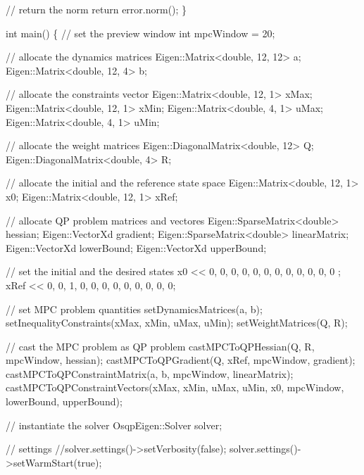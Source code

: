 \begin{DoxyCodeInclude}
    \textcolor{comment}{// return the norm}
    \textcolor{keywordflow}{return} error.norm();
\}


\textcolor{keywordtype}{int} main()
\{
    \textcolor{comment}{// set the preview window}
    \textcolor{keywordtype}{int} mpcWindow = 20;

    \textcolor{comment}{// allocate the dynamics matrices}
    Eigen::Matrix<double, 12, 12> a;
    Eigen::Matrix<double, 12, 4> b;

    \textcolor{comment}{// allocate the constraints vector}
    Eigen::Matrix<double, 12, 1> xMax;
    Eigen::Matrix<double, 12, 1> xMin;
    Eigen::Matrix<double, 4, 1> uMax;
    Eigen::Matrix<double, 4, 1> uMin;

    \textcolor{comment}{// allocate the weight matrices}
    Eigen::DiagonalMatrix<double, 12> Q;
    Eigen::DiagonalMatrix<double, 4> R;

    \textcolor{comment}{// allocate the initial and the reference state space}
    Eigen::Matrix<double, 12, 1> x0;
    Eigen::Matrix<double, 12, 1> xRef;

    \textcolor{comment}{// allocate QP problem matrices and vectores}
    Eigen::SparseMatrix<double> hessian;
    Eigen::VectorXd gradient;
    Eigen::SparseMatrix<double> linearMatrix;
    Eigen::VectorXd lowerBound;
    Eigen::VectorXd upperBound;

    \textcolor{comment}{// set the initial and the desired states}
    x0 << 0, 0, 0, 0, 0, 0, 0, 0, 0, 0, 0, 0 ;
    xRef <<  0, 0, 1, 0, 0, 0, 0, 0, 0, 0, 0, 0;

    \textcolor{comment}{// set MPC problem quantities}
    setDynamicsMatrices(a, b);
    setInequalityConstraints(xMax, xMin, uMax, uMin);
    setWeightMatrices(Q, R);

    \textcolor{comment}{// cast the MPC problem as QP problem}
    castMPCToQPHessian(Q, R, mpcWindow, hessian);
    castMPCToQPGradient(Q, xRef, mpcWindow, gradient);
    castMPCToQPConstraintMatrix(a, b, mpcWindow, linearMatrix);
    castMPCToQPConstraintVectors(xMax, xMin, uMax, uMin, x0, mpcWindow, lowerBound, upperBound);

    \textcolor{comment}{// instantiate the solver}
    OsqpEigen::Solver solver;

    \textcolor{comment}{// settings}
    \textcolor{comment}{//solver.settings()->setVerbosity(false);}
    solver.settings()->setWarmStart(\textcolor{keyword}{true});


\end{DoxyCodeInclude}
